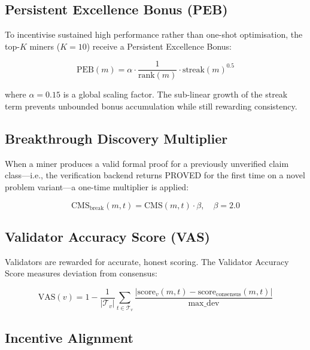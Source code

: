 \documentclass[11pt,a4paper]{article}
\begin{document}
\subsection{Persistent Excellence Bonus (PEB)}

To incentivise sustained high performance rather than one-shot
optimisation, the top-$K$ miners ($K = 10$) receive a Persistent
Excellence Bonus:

\begin{equation}
  \text{PEB}(m) = \alpha \cdot \frac{1}{\text{rank}(m)}
    \cdot \text{streak}(m)^{0.5}
  \label{eq:peb}
\end{equation}

\noindent where $\alpha = 0.15$ is a global scaling factor.  The
sub-linear growth of the streak term prevents unbounded bonus
accumulation while still rewarding consistency.

\subsection{Breakthrough Discovery Multiplier}

When a miner produces a valid formal proof for a previously unverified
claim class---i.e., the verification backend returns PROVED for the first
time on a novel problem variant---a one-time multiplier is applied:

\begin{equation}
  \text{CMS}_{\text{break}}(m, t) = \text{CMS}(m, t) \cdot \beta,
  \quad \beta = 2.0
  \label{eq:breakthrough}
\end{equation}

\subsection{Validator Accuracy Score (VAS)}

Validators are rewarded for accurate, honest scoring.  The Validator
Accuracy Score measures deviation from consensus:

\begin{equation}
  \text{VAS}(v) = 1 - \frac{1}{|\mathcal{T}_v|}
    \sum_{t \in \mathcal{T}_v}
    \frac{|\text{score}_v(m,t) - \text{score}_{\text{consensus}}(m,t)|}
         {\text{max\_dev}}
  \label{eq:vas}
\end{equation}

\subsection{Incentive Alignment}
\end{document}
